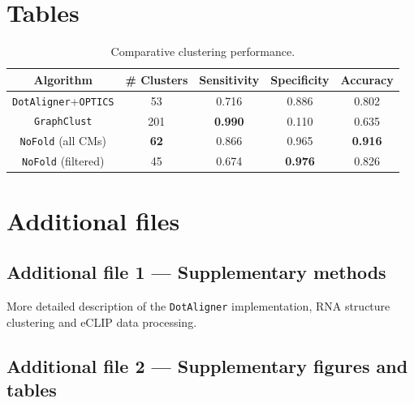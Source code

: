 \documentclass{bmcart}
\newcommand\dotaligner{\texttt{DotAligner}}
\newcommand\nofold{\texttt{NoFold}}
\begin{document}
\begin{backmatter}

\section*{Tables}

\begin{table}[h!]
\caption{ Comparative clustering performance. }
 \begin{tabular}{ccccc}
 \hline
 Algorithm & \# Clusters & Sensitivity & Specificity & Accuracy \\
 \hline
 \dotaligner{}+\texttt{OPTICS} & 53 & 0.716 & 0.886& 0.802\\
 \texttt{GraphClust} & 201 & \textbf{0.990} & 0.110 & 0.635\\ %
 \nofold{} (all CMs) & \textbf{62} & 0.866 & 0.965 & \textbf{0.916 }\\ %
 \nofold{} (filtered) & 45 & 0.674 & \textbf{0.976} & 0.826\\ %
 \hline
 \end{tabular}
\end{table}





\section*{Additional files}
  \subsection*{Additional file 1 --- Supplementary methods}
    More detailed description of the \dotaligner{} implementation, RNA structure clustering and eCLIP data processing.
  \subsection*{Additional file 2 --- Supplementary figures and tables}


\end{backmatter}

\clearpage
\end{document}

